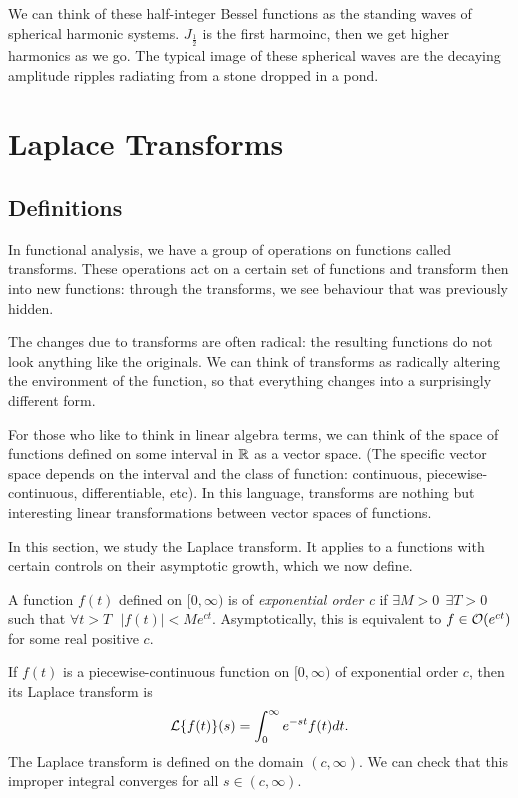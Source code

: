 \documentclass[fleqn,letterpaper]{report}
\begin{document}
We can think of these half-integer Bessel functions as the
standing waves of spherical harmonic systems.
$J_{\frac{1}{2}}$ is the first harmoinc, then
we get higher harmonics as we go. The typical image of these
spherical waves are the decaying amplitude ripples radiating
from a stone dropped in a pond.

\chapter{Laplace Transforms}
\label{laplace-transforms}

\section{Definitions}
\label{laplace-transforms-definitions}

In functional analysis, we have a group of operations on
functions called transforms. These operations act on a
certain set of functions and transform then into new functions:
through the transforms, we see behaviour that was previously
hidden.

The changes due to transforms are often radical: the resulting
functions do not look anything like the originals. We can
think of transforms as radically altering the environment of
the function, so that everything changes into a surprisingly
different form.

For those who like to think in linear algebra terms, we can
think of the space of functions defined on some interval in $\mathbb{R}$
as a vector space. (The specific vector space depends on the
interval and the class of function: continuous,
piecewise-continuous, differentiable, etc). In this language,
transforms are nothing but interesting linear transformations
between vector spaces of functions.

In this section, we study the Laplace transform. It applies to
a functions with certain controls on their asymptotic growth,
which we now define.  

\begin{defn}
A function $f(t)$ defined on $[0,
\infty)$ is of \emph{exponential order c} if $\exists M > 0 \ \
\exists T > 0$ such that $\forall t > T \ \ \ |f(t)| <
Me^{ct}$. Asymptotically, this is equivalent to $f \in
\mathcal{O}(e^{ct})$ for some real positive $c$. 
\end{defn}

If $f(t)$ is a piecewise-continuous function on $[0, \infty)$
of exponential order $c$, then its Laplace transform is 
\begin{equation*}
\mathcal{L} \{ f(t) \} (s) = \int_0^\infty e^{-st} f(t) dt.
\end{equation*}
The Laplace transform is defined on the domain $(c, \infty)$.
We can check that this improper integral converges
for all $s \in (c, \infty)$. 
\end{document}
